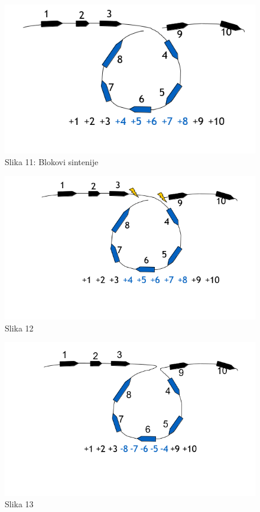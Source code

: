 \documentclass{article}
\begin{document}
\begin{figure}[h!]
\centering
\includegraphics[scale=0.5]{slike/promene1.PNG}
\caption{Slika 11: Blokovi sintenije}
\label{slika:X}
\end{figure}

\begin{figure}[h!]
\centering
\includegraphics[scale=0.5]{slike/promene2.PNG}
\caption{Slika 12}
\label{slika:X}
\end{figure}

\begin{figure}[h!]
\centering
\includegraphics[scale=0.5]{slike/promene3.PNG}
\caption{Slika 13}
\label{slika:X}
\end{figure}
\end{document}
